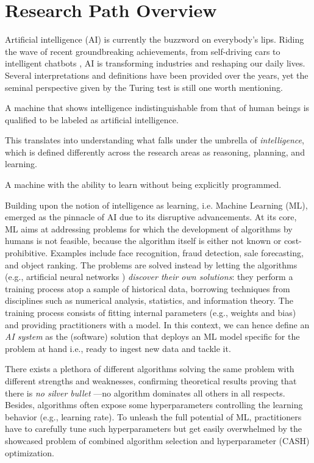 \chapter{Research Path Overview}
\label{chap:intro}

Artificial intelligence (AI) is currently the buzzword on everybody's lips.
Riding the wave of recent groundbreaking achievements, from self-driving cars \cite{badue2021self} to intelligent chatbots \cite{adamopoulou2020chatbots}, AI is transforming industries and reshaping our daily lives.
Several interpretations and definitions have been provided over the years, yet the seminal perspective given by the Turing test \cite{turing1980computing} is still one worth mentioning.
\begin{definition}
A machine that shows intelligence indistinguishable from that of human beings is qualified to be labeled as artificial intelligence.
\end{definition}
This translates into understanding what falls under the umbrella of \textit{intelligence}, which is defined differently across the research areas as reasoning, planning, and learning.
\begin{definition}
A machine with the ability to learn without being explicitly programmed.
\end{definition}
Building upon the notion of intelligence as learning, i.e. Machine Learning (ML), emerged as the pinnacle of AI due to its disruptive advancements.
At its core, ML aims at addressing problems for which the development of algorithms by humans is not feasible, because the algorithm itself is either not known or cost-prohibitive.
Examples include face recognition, fraud detection, sale forecasting, and object ranking.
The problems are solved instead by letting the algorithms (e.g., artificial neural networks \cite{bishop1994neural}) \textit{discover their own solutions}: they perform a training process atop a sample of historical data, borrowing techniques from disciplines such as numerical analysis, statistics, and information theory.
The training process consists of fitting internal parameters (e.g., weights and bias) and providing practitioners with a model.
In this context, we can hence define an \textit{AI system} as the (software) solution that deploys an ML model specific for the problem at hand i.e., ready to ingest new data and tackle it.

There exists a plethora of different algorithms solving the same problem with different strengths and weaknesses, confirming theoretical results proving that there is \textit{no silver bullet} \cite{kerschke2019automated}---no algorithm dominates all others in all respects.
Besides, algorithms often expose some hyperparameters controlling the learning behavior (e.g., learning rate).
To unleash the full potential of ML, practitioners have to carefully tune such hyperparameters but get easily overwhelmed by the showcased problem of combined algorithm selection and hyperparameter (CASH) optimization.

